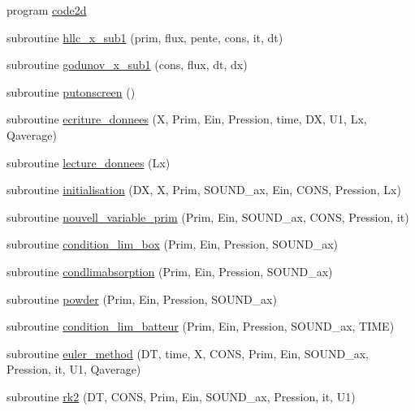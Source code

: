 \begin{DoxyCompactItemize}
\item 
program \mbox{\hyperlink{main1DOr2_8f90_a8712173bc20143ca5b1b8cbd782b563e}{code2d}}
\item 
subroutine \mbox{\hyperlink{main1DOr2_8f90_a86edd837bdc9a015ebd8a46212fe70ab}{hllc\+\_\+x\+\_\+sub1}} (prim, flux, pente, cons, it, dt)
\item 
subroutine \mbox{\hyperlink{main1DOr2_8f90_aec66a1d113ade1d60ad864482ea8e4cf}{godunov\+\_\+x\+\_\+sub1}} (cons, flux, dt, dx)
\item 
subroutine \mbox{\hyperlink{main1DOr2_8f90_a8a5b072c001df1496416cc96562c9916}{putonscreen}} ()
\item 
subroutine \mbox{\hyperlink{main1DOr2_8f90_a47ac97fd58c2f9695ffff2ee98d498c1}{ecriture\+\_\+donnees}} (X, Prim, Ein, Pression, time, DX, U1, Lx, Qaverage)
\item 
subroutine \mbox{\hyperlink{main1DOr2_8f90_a62516b42ea4fb4c0918eb7e43982d4a8}{lecture\+\_\+donnees}} (Lx)
\item 
subroutine \mbox{\hyperlink{main1DOr2_8f90_a2ab28d5afcb8110dd4d60685348cb3d3}{initialisation}} (DX, X, Prim, S\+O\+U\+N\+D\+\_\+ax, Ein, C\+O\+NS, Pression, Lx)
\item 
subroutine \mbox{\hyperlink{main1DOr2_8f90_aa208014933dc346cd26290f44b072d66}{nouvell\+\_\+variable\+\_\+prim}} (Prim, Ein, S\+O\+U\+N\+D\+\_\+ax, C\+O\+NS, Pression, it)
\item 
subroutine \mbox{\hyperlink{main1DOr2_8f90_ae72ce7fe5060af7e7c56122d5232f6c3}{condition\+\_\+lim\+\_\+box}} (Prim, Ein, Pression, S\+O\+U\+N\+D\+\_\+ax)
\item 
subroutine \mbox{\hyperlink{main1DOr2_8f90_abf21f0faeed0f3974f34fb740d77af75}{condlimabsorption}} (Prim, Ein, Pression, S\+O\+U\+N\+D\+\_\+ax)
\item 
subroutine \mbox{\hyperlink{main1DOr2_8f90_a9a3d7ad4173d691f4f090f6c4c4e05b3}{powder}} (Prim, Ein, Pression, S\+O\+U\+N\+D\+\_\+ax)
\item 
subroutine \mbox{\hyperlink{main1DOr2_8f90_ab89119a8e79210de76ccde93ce834633}{condition\+\_\+lim\+\_\+batteur}} (Prim, Ein, Pression, S\+O\+U\+N\+D\+\_\+ax, T\+I\+ME)
\item 
subroutine \mbox{\hyperlink{main1DOr2_8f90_a61ef0ae28fb906748d601350a093a3fa}{euler\+\_\+method}} (DT, time, X, C\+O\+NS, Prim, Ein, S\+O\+U\+N\+D\+\_\+ax, Pression, it, U1, Qaverage)
\item 
subroutine \mbox{\hyperlink{main1DOr2_8f90_abf018793b221c901580957ed90346b9d}{rk2}} (DT, C\+O\+NS, Prim, Ein, S\+O\+U\+N\+D\+\_\+ax, Pression, it, U1)

\end{DoxyCompactItemize}
